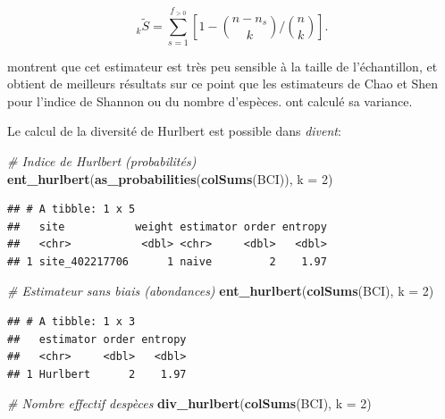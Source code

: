 \documentclass[
  11pt,
  american,
  a4paper,
  extrafontsizes,onecolumn,openright
  ]{memoir}
\newenvironment{Shaded}{\begin{snugshade}}{\end{snugshade}}
\newcommand{\AttributeTok}[1]{\textcolor[rgb]{0.13,0.29,0.53}{#1}}
\newcommand{\CommentTok}[1]{\textcolor[rgb]{0.56,0.35,0.01}{\textit{#1}}}
\newcommand{\DecValTok}[1]{\textcolor[rgb]{0.00,0.00,0.81}{#1}}
\newcommand{\FunctionTok}[1]{\textcolor[rgb]{0.13,0.29,0.53}{\textbf{#1}}}
\newcommand{\NormalTok}[1]{#1}
\begin{document}
\begin{equation}
  \label{eq:EstHurlbert}
  _k{\tilde{S}}
  = \sum_{s=1}^{f_{>0}}{\left[ 1-{\binom{n - n_s}{k}}/{\binom{n}{k}} \right]}.
\end{equation}

\textcite{Dauby2012} montrent que cet estimateur est très peu sensible à la taille de l'échantillon, et obtient de meilleurs résultats sur ce point que les estimateurs de Chao et Shen pour l'indice de Shannon ou du nombre d'espèces.
\textcite{Smith1977} ont calculé sa variance.

Le calcul de la diversité de Hurlbert est possible dans \emph{divent}:

\scriptsize

\begin{Shaded}
\begin{Highlighting}[]
\CommentTok{\# Indice de Hurlbert (probabilités)}
\FunctionTok{ent\_hurlbert}\NormalTok{(}\FunctionTok{as\_probabilities}\NormalTok{(}\FunctionTok{colSums}\NormalTok{(BCI)), }\AttributeTok{k =} \DecValTok{2}\NormalTok{)}
\end{Highlighting}
\end{Shaded}

\begin{verbatim}
## # A tibble: 1 x 5
##   site           weight estimator order entropy
##   <chr>           <dbl> <chr>     <dbl>   <dbl>
## 1 site_402217706      1 naive         2    1.97
\end{verbatim}

\begin{Shaded}
\begin{Highlighting}[]
\CommentTok{\# Estimateur sans biais (abondances)}
\FunctionTok{ent\_hurlbert}\NormalTok{(}\FunctionTok{colSums}\NormalTok{(BCI), }\AttributeTok{k =} \DecValTok{2}\NormalTok{)}
\end{Highlighting}
\end{Shaded}

\begin{verbatim}
## # A tibble: 1 x 3
##   estimator order entropy
##   <chr>     <dbl>   <dbl>
## 1 Hurlbert      2    1.97
\end{verbatim}

\begin{Shaded}
\begin{Highlighting}[]
\CommentTok{\# Nombre effectif d\textquotesingle{}espèces}
\FunctionTok{div\_hurlbert}\NormalTok{(}\FunctionTok{colSums}\NormalTok{(BCI), }\AttributeTok{k =} \DecValTok{2}\NormalTok{)}
\end{Highlighting}
\end{Shaded}
\end{document}

